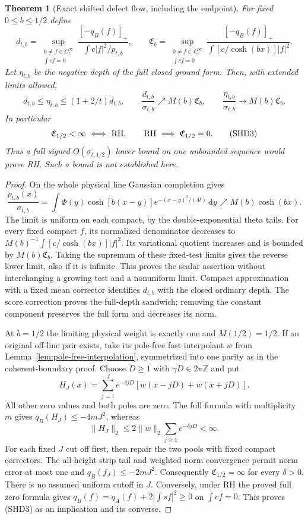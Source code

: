 \documentclass[11pt]{article}
\newtheorem{theorem}{Theorem}
\theoremstyle{remark}\newtheorem{remark}[theorem]{Remark}
\newcommand{\dd}{\,\mathrm d}
\begin{document}
\begin{theorem}[Exact shifted defect flow, including the endpoint]
\label{thm:shifted-defect-flow}
For fixed $0\le b\le1/2$ define
\[
 d_{t,b}=
 \sup_{\substack{0\ne f\in C_c^\infty\\\int cf=0}}
 \frac{[-q_B(f)]_+}{\int c|f|^2/p_{t,b}},
 \qquad
 \mathfrak C_b=
 \sup_{\substack{0\ne f\in C_c^\infty\\\int cf=0}}
 \frac{[-q_B(f)]_+}{\int[c/\cosh(bx)]|f|^2}.        \tag{SHD1}
\]
Let $\eta_{t,b}$ be the negative depth of the full closed
ground form. Then, with extended limits allowed,
\[
 d_{t,b}\le\eta_{t,b}\le(1+2/t)d_{t,b},\qquad
 \frac{d_{t,b}}{\sigma_{t,b}}\nearrow M(b)\mathfrak C_b,
 \qquad
 \frac{\eta_{t,b}}{\sigma_{t,b}}\longrightarrow
                       M(b)\mathfrak C_b.           \tag{SHD2}
\]
In particular
\[
 \mathfrak C_{1/2}<\infty\ \Longleftrightarrow\ {\rm RH},
 \qquad
 {\rm RH}\ \Longrightarrow\ \mathfrak C_{1/2}=0.     \tag{SHD3}
\]
Thus a full signed $O(\sigma_{t,1/2})$ lower bound on one
unbounded sequence would prove RH. Such a bound is not
established here.
\end{theorem}
\begin{proof}
On the whole physical line Gaussian completion gives
\[
 \frac{p_{t,b}(x)}{\sigma_{t,b}}=
 \int\Phi(y)\cosh[b(x-y)]e^{-(x-y)^2/(4t)}\dd y
       \nearrow M(b)\cosh(bx).                     \tag{SHD4}
\]
The limit is uniform on each compact, by the double-exponential
theta tails. For every fixed compact $f$, its normalized
denominator decreases to
$M(b)^{-1}\int[c/\cosh(bx)]|f|^2$.
Its variational quotient increases and is bounded by
$M(b)\mathfrak C_b$. Taking the supremum of these fixed-test
limits gives the reverse lower limit, also if it is infinite.
This proves the scalar assertion without interchanging a
growing test and a nonuniform limit. Compact approximation
with a fixed mean corrector identifies $d_{t,b}$ with the
closed ordinary depth. The score correction proves the
full-depth sandwich; removing the constant component preserves
the full form and decreases its norm.

At $b=1/2$ the limiting physical weight is exactly one and
$M(1/2)=1/2$. If an original off-line pair exists, take its
pole-free fast interpolant $w$ from
Lemma~\ref{lem:pole-free-interpolation}, symmetrized into
one parity as in the coherent-boundary proof.
Choose $D\ge1$ with $\gamma D\in2\pi\mathbb Z$ and put
\[
 H_J(x)=\sum_{j=1}^J e^{-\delta jD}
                         [w(x-jD)+w(x+jD)] .
\]
All other zero values and both poles are zero. The full
formula with multiplicity $m$ gives $q_B(H_J)\le-4mJ^2$,
whereas
\[
 \|H_J\|_2\le2\|w\|_2\sum_{j\ge1}e^{-\delta jD}<\infty.
\]
For each fixed $J$ cut off first, then repair the two pools
with fixed compact correctors. The all-height strip tail
and weighted norm convergence permit norm error at most one
and $q_B(f_J)\le-2mJ^2$. Consequently
$\mathfrak C_{1/2}=\infty$ for every $\delta>0$.
There is no assumed uniform cutoff in $J$.
Conversely, under RH the proved full zero formula gives
$q_B(f)=q_A(f)+2|\int sf|^2\ge0$ on $\int cf=0$.
This proves (SHD3) as an implication and its converse.
\end{proof}
\end{document}
